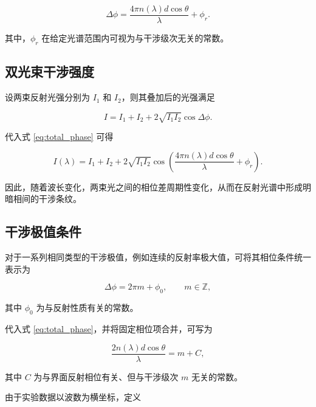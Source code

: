 \documentclass[UTF8,12pt,a4paper]{ctexart}
\begin{document}
\begin{equation}
    \boxed{
    \Delta\phi
    =
    \frac{4\pi n(\lambda)d\cos\theta}{\lambda}
    +
    \phi_r
    }.
    \label{eq:total_phase}
\end{equation}

其中，$\phi_r$ 在给定光谱范围内可视为与干涉级次无关的常数。

\subsection{双光束干涉强度}

设两束反射光强分别为 $I_1$ 和 $I_2$，则其叠加后的光强满足

\begin{equation}
    I
    =
    I_1+I_2
    +
    2\sqrt{I_1I_2}\cos\Delta\phi.
    \label{eq:interference_intensity}
\end{equation}

代入式 \eqref{eq:total_phase} 可得

\begin{equation}
    I(\lambda)
    =
    I_1+I_2
    +
    2\sqrt{I_1I_2}
    \cos
    \left(
    \frac{4\pi n(\lambda)d\cos\theta}{\lambda}
    +
    \phi_r
    \right).
\end{equation}

因此，随着波长变化，两束光之间的相位差周期性变化，从而在反射光谱中形成明暗相间的干涉条纹。

\subsection{干涉极值条件}

对于一系列相同类型的干涉极值，例如连续的反射率极大值，可将其相位条件统一表示为

\begin{equation}
    \Delta\phi
    =
    2\pi m+\phi_0,
    \qquad m\in\mathbb{Z},
\end{equation}

其中 $\phi_0$ 为与反射性质有关的常数。

代入式 \eqref{eq:total_phase}，并将固定相位项合并，可写为

\begin{equation}
    \frac{2n(\lambda)d\cos\theta}{\lambda}
    =
    m+C,
    \label{eq:order_lambda}
\end{equation}

其中 $C$ 为与界面反射相位有关、但与干涉级次 $m$ 无关的常数。

由于实验数据以波数为横坐标，定义
\end{document}
